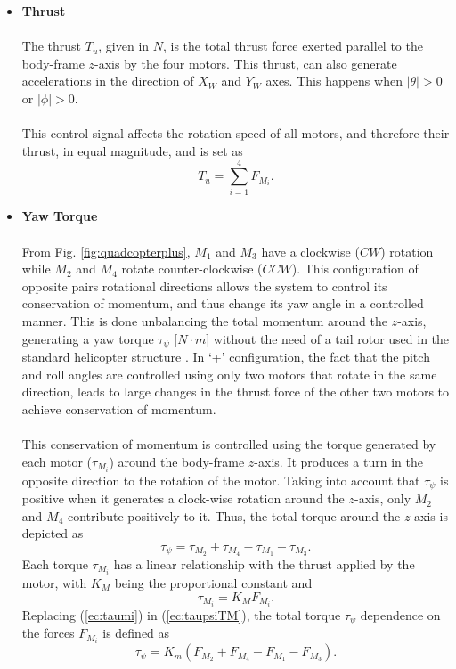 \begin{itemize}
\item \textbf{Thrust}\\\\
The thrust $T_u$, given in $N$, is the total thrust force exerted parallel to the body-frame $z$-axis by the four motors. This thrust, can also generate accelerations in the direction of $X_W$ and $Y_W$ axes. This happens when $|\theta| > 0$ or $|\phi| > 0$.
\\\\
This control signal affects the rotation speed of all motors, and therefore their thrust, in equal magnitude, and is set as
\begin{equation}
\label{ec:u+}
T_u = \sum_{i=1}^{4}F_{M_i}.
\end{equation}

\item \textbf{Yaw Torque}\\\\
From Fig. \ref{fig:quadcopterplus}, $M_1$ and $M_3$ have a clockwise ($CW$) rotation while $M_2$ and $M_4$ rotate counter-clockwise ($CCW$). This configuration of opposite pairs rotational directions allows the system to control its conservation of momentum, and thus change its yaw angle in a controlled manner. This is done unbalancing the total momentum around the $z$-axis, generating a yaw torque $\tau_{\psi}$ [$N\cdot m$] without the need of a tail rotor used in the standard helicopter structure \cite{Bresciani2008}. In `+' configuration, the fact that the pitch and roll angles are controlled using only two motors that rotate in the same direction, leads to large changes in the thrust force of the other two motors to achieve conservation of momentum.
\\\\
This conservation of momentum is controlled using the torque generated by each motor ($\tau_{M_i}$) around the body-frame $z$-axis. It produces a turn in the opposite direction to the rotation of the motor. Taking into account that $\tau_\psi$ is positive when it generates a clock-wise rotation around the $z$-axis, only $M_2$ and $M_4$ contribute positively to it. Thus, the total torque around the $z$-axis is depicted as
\begin{equation}
\label{ec:taupsiTM}
\tau_{\psi} = \tau_{M_2} + \tau_{M_4} - \tau_{M_1} - \tau_{M_3}.
\end{equation}
Each torque $\tau_{M_i}$ has a linear relationship with the thrust applied by the motor, with $K_M$ being the proportional constant and
\begin{equation}
\label{ec:taumi}
\tau_{M_{i}} = K_{M}F_{M_i}.
\end{equation}
Replacing (\ref{ec:taumi}) in (\ref{ec:taupsiTM}), the total torque $\tau_\psi$ dependence on the forces $F_{M_i}$ is defined as
\begin{equation}
\label{ec:taupsi+}
\tau_{\psi} = K_{m}(F_{M_2} + F_{M_4} - F_{M_1} - F_{M_3}).
\end{equation}


\end{itemize}
